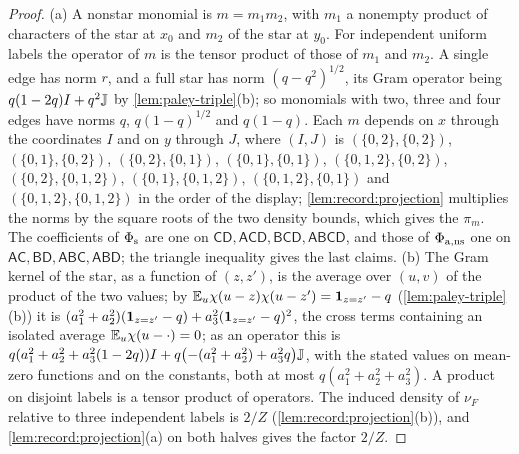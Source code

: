\begin{proof}
(a) A nonstar monomial is $m=m_1m_2$, with $m_1$ a nonempty product of characters of
the star at $x_0$ and $m_2$ of the star at $y_0$. For independent uniform labels
the operator of $m$ is the tensor product of those of $m_1$ and $m_2$. A single
edge has norm $r$, and a full star has norm $(q-q^2)^{1/2}$, its Gram operator
being $q(1-2q)I+q^2\mathbb J$ by \cref{lem:paley-triple}(b); so monomials with two,
three and four edges have norms $q$, $q(1-q)^{1/2}$ and $q(1-q)$. Each $m$
depends on $x$ through the coordinates $I$ and on $y$ through $J$, where
$(I,J)$ is $(\{0,2\},\{0,2\})$, $(\{0,1\},\{0,2\})$, $(\{0,2\},\{0,1\})$,
$(\{0,1\},\{0,1\})$, $(\{0,1,2\},\{0,2\})$, $(\{0,2\},\{0,1,2\})$,
$(\{0,1\},\{0,1,2\})$, $(\{0,1,2\},\{0,1\})$ and $(\{0,1,2\},\{0,1,2\})$ in the order
of the display; \cref{lem:record:projection} multiplies the norms by the square
roots of the two density bounds, which gives the $\pi_m$. The coefficients of
$\Phi_{\rm s}$ are one on $\mathsf C\mathsf D,\mathsf A\mathsf C\mathsf D,
\mathsf B\mathsf C\mathsf D,\mathsf A\mathsf B\mathsf C\mathsf D$, and those of
$\Phi_{\rm a,ns}$ one on $\mathsf A\mathsf C,\mathsf B\mathsf D,\mathsf A\mathsf B
\mathsf C,\mathsf A\mathsf B\mathsf D$; the triangle inequality gives the last
claims.
(b) The Gram kernel of the star, as a function of $(z,z')$, is the average over
$(u,v)$ of the product of the two values; by
$\mathbb E_u\chi(u-z)\chi(u-z')=\mathbf 1_{z=z'}-q$ (\cref{lem:paley-triple}(b)) it is
$(a_1^2+a_2^2)(\mathbf 1_{z=z'}-q)+a_3^2(\mathbf 1_{z=z'}-q)^2$, the cross terms containing
an isolated average $\mathbb E_u\chi(u-\cdot)=0$; as an operator this is
$q(a_1^2+a_2^2+a_3^2(1-2q))I+q\bigl(-(a_1^2+a_2^2)+a_3^2q\bigr)\mathbb J$, with the
stated values on mean-zero functions and on the constants, both at most
$q(a_1^2+a_2^2+a_3^2)$. A product on disjoint labels is a tensor product of
operators. The induced density of $\nu_F$ relative to three independent labels
is $2/Z$ (\cref{lem:record:projection}(b)), and \cref{lem:record:projection}(a)
on both halves gives the factor $2/Z$.
\end{proof}

